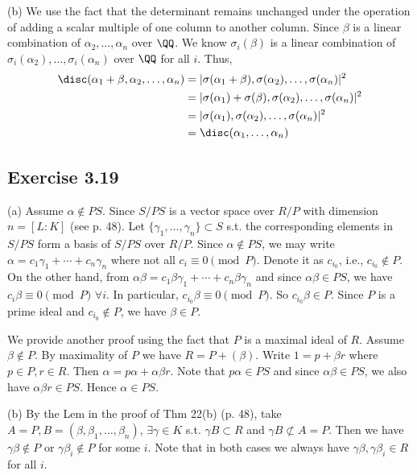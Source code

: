 \documentclass[../Chapter.tex]{subfiles}
\begin{document}
(b) We use the fact that the determinant remains unchanged under the operation of adding a scalar multiple of one column to another column. Since $\beta$ is a linear combination of $\alpha_2,\ldots,\alpha_n$ over $\QQ$. We know $\sigma_i(\beta)$ is a linear combination of $\sigma_i(\alpha_2),\ldots,\sigma_i(\alpha_n)$ over $\QQ$ for all $i$. Thus,
\begin{align*}
\disc(\alpha_1+\beta,\alpha_2,\ldots,\alpha_n) &= |\sigma(\alpha_1+\beta),\sigma(\alpha_2),\ldots,\sigma(\alpha_n)|^2 \\
&=|\sigma(\alpha_1)+\sigma(\beta),\sigma(\alpha_2),\ldots,\sigma(\alpha_n)|^2  \\
&= |\sigma(\alpha_1),\sigma(\alpha_2),\ldots,\sigma(\alpha_n)|^2 \\
&= \disc(\alpha_1,\ldots,\alpha_n)
\end{align*}

\subsection*{Exercise 3.19}

(a) Assume $\alpha\notin PS$. Since $S/PS$ is a vector space over $R/P$ with dimension $n=[L:K]$ (see p. 48). Let $\{\gamma_1,\ldots,\gamma_n\}\subset S$ s.t. the corresponding elements in $S/PS$ form a basis of $S/PS$ over $R/P$. Since $\alpha\notin PS$, we may write $\alpha=c_1\gamma_1+\cdots+c_n\gamma_n$ where not all $c_i \equiv 0 \pmod{P}$. Denote it as $c_{i_0}$, i.e., $c_{i_0}\notin P$. On the other hand, from $\alpha\beta=c_1\beta\gamma_1+\cdots+c_n\beta\gamma_n$ and since $\alpha\beta\in PS$, we have $c_i\beta \equiv 0 \pmod{P}$ $\forall i$. In particular, $c_{i_0}\beta\equiv 0 \pmod{P}$. So $c_{i_0}\beta\in P$. Since $P$ is a prime ideal and $c_{i_0}\notin P$, we have $\beta\in P$.

We provide another proof using the fact that $P$ is a maximal ideal of $R$. Assume $\beta\notin P$. By maximality of $P$ we have $R=P+(\beta)$. Write $1=p+\beta r$ where $p\in P,r\in R$. Then $\alpha=p \alpha+\alpha\beta r$. Note that $p\alpha\in PS$ and since $\alpha\beta\in PS$, we also have $\alpha\beta r\in PS$. Hence $\alpha\in PS$.

(b) By the Lem in the proof of Thm 22(b) (p. 48), take $A=P,B=(\beta,\beta_1,\ldots,\beta_n)$, $\exists\gamma\in K$ s.t. $\gamma B\subset R$ and $\gamma B \not\subset A=P$. Then we have $\gamma\beta\notin P$ or $\gamma\beta_i\notin P$ for some $i$. Note that in both cases we always have $\gamma\beta,\gamma\beta_i \in R$ for all $i$.
\end{document}
